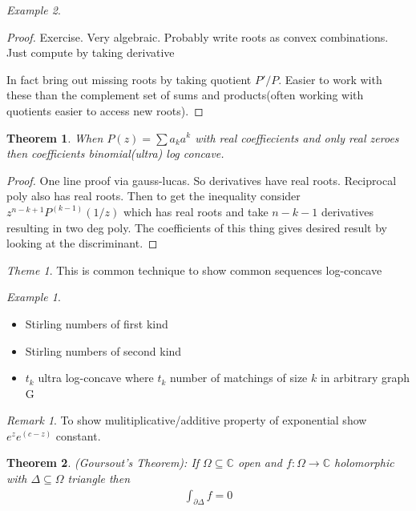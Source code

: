 \documentclass[11pt]{article}
\newcommand{\C}{\mathbb{C}}
\newtheorem{theorem}{Theorem}
\theoremstyle{remark}
\newtheorem{remark}{Remark}
\newtheorem{theme}{Theme}
\newtheorem{example}{Example}
\begin{document}
\begin{example}
\begin{proof}
	Exercise. Very algebraic. Probably write roots as convex combinations. Just compute by taking derivative

	In fact bring out missing roots by taking quotient $P'/P$. Easier to work with these than the complement set of sums and products(often working with quotients easier to access new roots).
\end{proof}

\begin{theorem}
	When $P(z) = \sum a_k a^k$ with real coeffiecients and only real zeroes then coefficients binomial(ultra) log concave.
\end{theorem}

\begin{proof}
	One line proof via gauss-lucas. So derivatives have real roots. Reciprocal poly also has real roots. Then to get the inequality consider $z^{n-k+1}P^{(k-1)}(1/z)$ which has real roots and take $n-k-1$ derivatives resulting in two deg poly. The coefficients of this thing gives desired result by looking at the discriminant.
\end{proof}

\begin{theme}
	This is common technique to show common sequences log-concave
\end{theme}

\begin{example}
	\begin{itemize}
		\item Stirling numbers of first kind
		\item Stirling numbers of second kind
		\item $t_k$ ultra log-concave where $t_k$ number of matchings of size $k$ in arbitrary graph G
	\end{itemize}
\end{example}

\begin{remark}
	To show mulitiplicative/additive property of exponential show $e^ze^(c-z)$ constant.
\end{remark}

\begin{theorem}
	(Goursout's Theorem): If $\Omega \subseteq \C$ open and $f : \Omega \to \C$ holomorphic with $\Delta \subseteq \Omega$ triangle then 
	\begin{align*}
		\int_{\partial \Delta} f = 0
	\end{align*}
\end{theorem}


\end{example}
\end{document}
